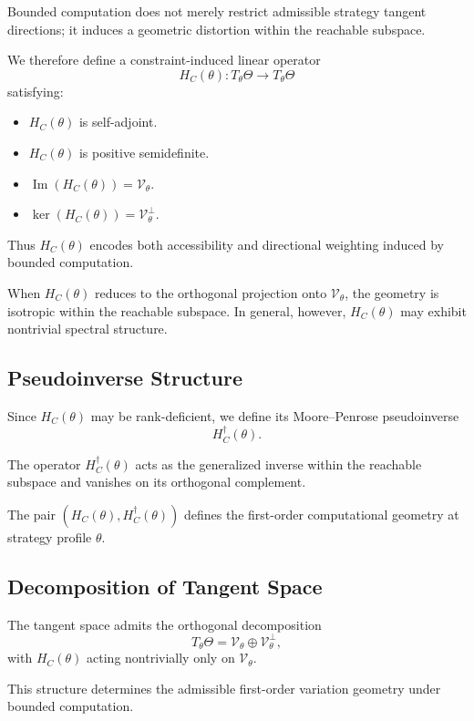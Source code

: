 \documentclass[11pt,a4paper,twocolumn]{article}
\begin{document}
 Bounded computation does not merely restrict admissible strategy tangent directions; it induces a geometric distortion within the reachable subspace.
 
 We therefore define a constraint-induced linear operator
 \[
 H_C(\theta) : T_\theta \Theta \to T_\theta \Theta
 \]
 satisfying:
 
 \begin{itemize}
  \item[(B1)] $H_C(\theta)$ is self-adjoint.
  \item[(B2)] $H_C(\theta)$ is positive semidefinite.
  \item[(B3)] $\operatorname{Im}(H_C(\theta)) = \mathcal{V}_\theta$.
  \item[(B4)] $\ker(H_C(\theta)) = \mathcal{V}_\theta^\perp$.
 \end{itemize}
 
 Thus $H_C(\theta)$ encodes both accessibility and directional weighting induced by bounded computation.
 
 When $H_C(\theta)$ reduces to the orthogonal projection onto $\mathcal{V}_\theta$, the geometry is isotropic within the reachable subspace. In general, however, $H_C(\theta)$ may exhibit nontrivial spectral structure.
 
 \subsection{Pseudoinverse Structure}
 
 Since $H_C(\theta)$ may be rank-deficient, we define its Moore–Penrose pseudoinverse
 \[
 H_C^\dagger(\theta).
 \]
 
 The operator $H_C^\dagger(\theta)$ acts as the generalized inverse within the reachable subspace and vanishes on its orthogonal complement.
 
 The pair $(H_C(\theta), H_C^\dagger(\theta))$ defines the first-order computational geometry at strategy profile $\theta$.
 
 \subsection{Decomposition of Tangent Space}
 
 The tangent space admits the orthogonal decomposition
 \[
 T_\theta \Theta = \mathcal{V}_\theta \oplus \mathcal{V}_\theta^\perp,
 \]
 with $H_C(\theta)$ acting nontrivially only on $\mathcal{V}_\theta$.
 
 This structure determines the admissible first-order variation geometry under bounded computation.
 
\end{document}
